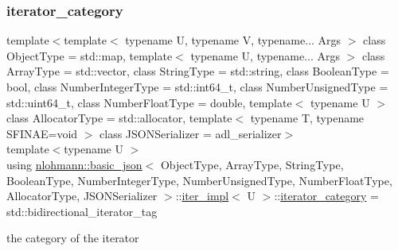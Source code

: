 \subsubsection{\texorpdfstring{iterator\+\_\+category}{iterator\_category}}
{\footnotesize\ttfamily template$<$template$<$ typename U, typename V, typename... Args $>$ class Object\+Type = std\+::map, template$<$ typename U, typename... Args $>$ class Array\+Type = std\+::vector, class String\+Type  = std\+::string, class Boolean\+Type  = bool, class Number\+Integer\+Type  = std\+::int64\+\_\+t, class Number\+Unsigned\+Type  = std\+::uint64\+\_\+t, class Number\+Float\+Type  = double, template$<$ typename U $>$ class Allocator\+Type = std\+::allocator, template$<$ typename T, typename S\+F\+I\+N\+A\+E=void $>$ class J\+S\+O\+N\+Serializer = adl\+\_\+serializer$>$ \\
template$<$typename U $>$ \\
using \hyperlink{classnlohmann_1_1basic__json}{nlohmann\+::basic\+\_\+json}$<$ Object\+Type, Array\+Type, String\+Type, Boolean\+Type, Number\+Integer\+Type, Number\+Unsigned\+Type, Number\+Float\+Type, Allocator\+Type, J\+S\+O\+N\+Serializer $>$\+::\hyperlink{classnlohmann_1_1basic__json_1_1iter__impl}{iter\+\_\+impl}$<$ U $>$\+::\hyperlink{classnlohmann_1_1basic__json_1_1iter__impl_adbe1b700b9cdc38f6991fc68683a9c2c}{iterator\+\_\+category} =  std\+::bidirectional\+\_\+iterator\+\_\+tag}



the category of the iterator 

\mbox{\label{classnlohmann_1_1basic__json_1_1iter__impl_a3dddd7fa38b36e2531700ceb4a1ce9a8}} 
